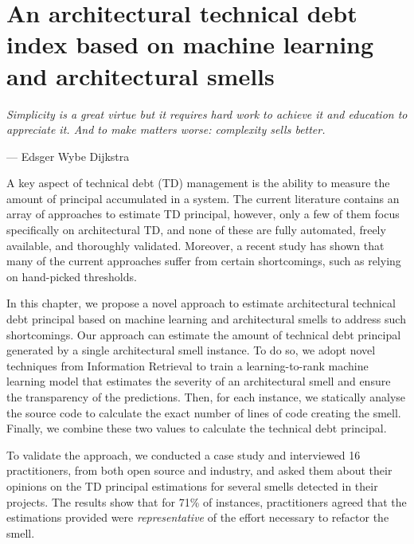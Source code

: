 \setlength{\headheight}{1.2cm}
\renewcommand{\publ}{\flushleft\footnotesize{This chapter has been submitted to a peer-reviewed journal.\\[0.1cm]}}

\chapter{An architectural technical debt index based on machine learning and architectural smells}
\label{chap:6}
\epigraph{\emph{Simplicity is a great virtue but it requires hard work to achieve it and education to appreciate it. And to make matters worse: complexity sells better.}}{--- Edsger Wybe Dijkstra}

\begin{Abstract}
	A key aspect of technical debt (TD) management is the ability to measure the amount of principal accumulated in a system.
    The current literature contains an array of approaches to estimate TD principal, however, only a few of them focus specifically on architectural TD, and none of these are fully automated, freely available, and thoroughly validated.
    Moreover, a recent study has shown that many of the current approaches suffer from certain shortcomings, such as relying on hand-picked thresholds.
    
    In this chapter, we propose a novel approach to estimate architectural technical debt principal based on machine learning and architectural smells to address such shortcomings.
    Our approach can estimate the amount of technical debt principal generated by a single architectural smell instance.
    To do so, we adopt novel techniques from Information Retrieval to train a learning-to-rank machine learning model that estimates the severity of an architectural smell and ensure the transparency of the predictions.
    Then, for each instance, we statically analyse the source code to calculate the exact number of lines of code creating the smell.
    Finally, we combine these two values to calculate the technical debt principal.
    
    To validate the approach, we conducted a case study and interviewed 16 practitioners, from both open source and industry, and asked them about their opinions on the TD principal estimations for several smells detected in their projects.
    The results show that for 71\% of instances, practitioners agreed that the estimations provided were \emph{representative} of the effort necessary to refactor the smell.
\end{Abstract}

